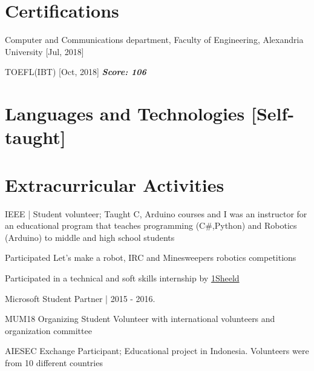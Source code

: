 \documentclass[paper=a4,fontsize=11pt]{scrartcl} %
\newcommand{\BoldIt}[1]{\textbf{\textit{#1}}}
\begin{document}
\section{Certifications}
\begin{itemize*}
	\item Computer and Communications department, Faculty of Engineering, Alexandria University [Jul, 2018] %
	\item TOEFL(IBT) [Oct, 2018] \BoldIt{Score: 106}
\end{itemize*}
\section{Languages and Technologies [Self-taught]}
\section{Extracurricular Activities}

\begin{itemize*}
	\item IEEE | Student volunteer; Taught C, Arduino courses and I was an instructor for an educational program that teaches programming (C\#,Python) and Robotics (Arduino) to middle and high school students
	\item Participated Let's make a robot, IRC and Minesweepers robotics competitions
	\item Participated in a technical and soft skills internship by \href{https://1sheeld.com/}{1Sheeld}
	\item Microsoft Student Partner | 2015 - 2016.
	\item MUM18 Organizing Student Volunteer with international volunteers and organization committee
	\item AIESEC Exchange Participant; Educational project in Indonesia. Volunteers were from 10 different countries
\end{itemize*}
\end{document}
